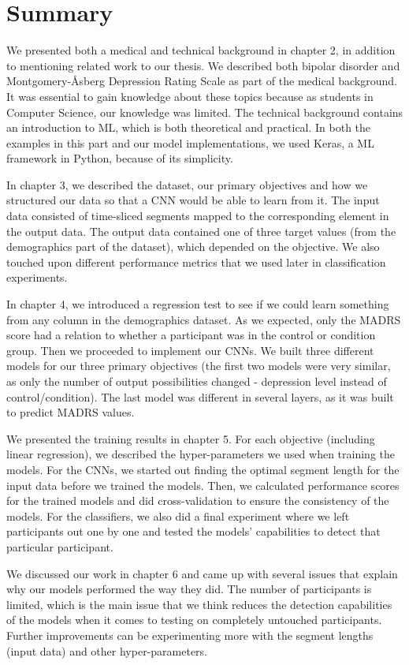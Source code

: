 \section{Summary}
We presented both a medical and technical background in chapter 2, in addition to mentioning related work to our thesis. We described both bipolar disorder and Montgomery-Åsberg Depression Rating Scale as part of the medical background. It was essential to gain knowledge about these topics because as students in Computer Science, our knowledge was limited. The technical background contains an introduction to ML, which is both theoretical and practical. In both the examples in this part and our model implementations, we used Keras, a ML framework in Python, because of its simplicity. 

In chapter 3, we described the dataset, our primary objectives and how we structured our data so that a CNN would be able to learn from it. The input data consisted of time-sliced segments mapped to the corresponding element in the output data. The output data contained one of three target values (from the demographics part of the dataset), which depended on the objective. We also touched upon different performance metrics that we used later in classification experiments.

In chapter 4, we introduced a regression test to see if we could learn something from any column in the demographics dataset. As we expected, only the MADRS score had a relation to whether a participant was in the control or condition group. Then we proceeded to implement our CNNs. We built three different models for our three primary objectives (the first two models were very similar, as only the number of output possibilities changed - depression level instead of control/condition). The last model was different in several layers, as it was built to predict MADRS values. 

We presented the training results in chapter 5. For each objective (including linear regression), we described the hyper-parameters we used when training the models. For the CNNs, we started out finding the optimal segment length for the input data before we trained the models. Then, we calculated performance scores for the trained models and did cross-validation to ensure the consistency of the models. For the classifiers, we also did a final experiment where we left participants out one by one and tested the models' capabilities to detect that particular participant.

We discussed our work in chapter 6 and came up with several issues that explain why our models performed the way they did. The number of participants is limited, which is the main issue that we think reduces the detection capabilities of the models when it comes to testing on completely untouched participants. Further improvements can be experimenting more with the segment lengths (input data) and other hyper-parameters. 

